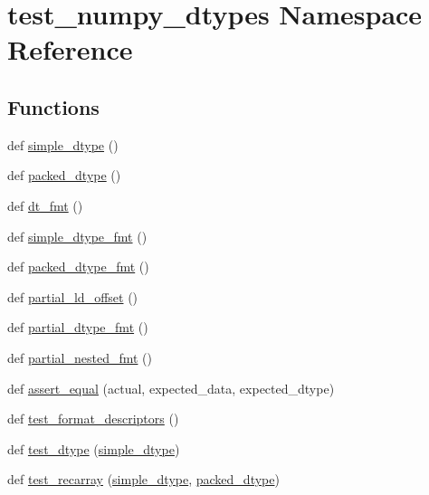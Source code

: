 \hypertarget{namespacetest__numpy__dtypes}{}\section{test\+\_\+numpy\+\_\+dtypes Namespace Reference}
\label{namespacetest__numpy__dtypes}
\subsection*{Functions}
\begin{DoxyCompactItemize}
\item 
def \mbox{\hyperlink{namespacetest__numpy__dtypes_af3915f7219b86b8961e112b56d38363b}{simple\+\_\+dtype}} ()
\item 
def \mbox{\hyperlink{namespacetest__numpy__dtypes_ac0c202d9ca2c124710d75697edbcae74}{packed\+\_\+dtype}} ()
\item 
def \mbox{\hyperlink{namespacetest__numpy__dtypes_a3340c292037469bf3bac5188bd37079c}{dt\+\_\+fmt}} ()
\item 
def \mbox{\hyperlink{namespacetest__numpy__dtypes_aae7335e0a95ca71ec61f3ea36ff6bd47}{simple\+\_\+dtype\+\_\+fmt}} ()
\item 
def \mbox{\hyperlink{namespacetest__numpy__dtypes_ac7774fc6b30b6ce64ac905a92d2e42b9}{packed\+\_\+dtype\+\_\+fmt}} ()
\item 
def \mbox{\hyperlink{namespacetest__numpy__dtypes_ac18d123b0f0ef4faf1ad3b27edfb8523}{partial\+\_\+ld\+\_\+offset}} ()
\item 
def \mbox{\hyperlink{namespacetest__numpy__dtypes_a0b2765abf677c9b169d4a247beec5ab2}{partial\+\_\+dtype\+\_\+fmt}} ()
\item 
def \mbox{\hyperlink{namespacetest__numpy__dtypes_a06b4645029b908a2ce132db89ca778ac}{partial\+\_\+nested\+\_\+fmt}} ()
\item 
def \mbox{\hyperlink{namespacetest__numpy__dtypes_ab4b41fdc1a6ed611d728987ec73739a2}{assert\+\_\+equal}} (actual, expected\+\_\+data, expected\+\_\+dtype)
\item 
def \mbox{\hyperlink{namespacetest__numpy__dtypes_aacd66449288befdc39a42f498bf040dc}{test\+\_\+format\+\_\+descriptors}} ()
\item 
def \mbox{\hyperlink{namespacetest__numpy__dtypes_a558dd280d68014400c0d80c7daafa11f}{test\+\_\+dtype}} (\mbox{\hyperlink{namespacetest__numpy__dtypes_af3915f7219b86b8961e112b56d38363b}{simple\+\_\+dtype}})
\item 
def \mbox{\hyperlink{namespacetest__numpy__dtypes_adbaed59087f2cdb6309385508e7955d6}{test\+\_\+recarray}} (\mbox{\hyperlink{namespacetest__numpy__dtypes_af3915f7219b86b8961e112b56d38363b}{simple\+\_\+dtype}}, \mbox{\hyperlink{namespacetest__numpy__dtypes_ac0c202d9ca2c124710d75697edbcae74}{packed\+\_\+dtype}})

\end{DoxyCompactItemize}

